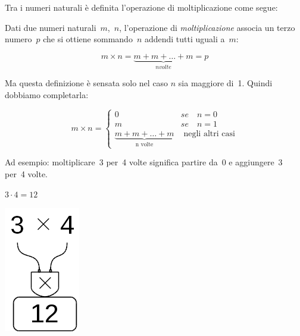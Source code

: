 Tra i numeri naturali è definita l'operazione di moltiplicazione come segue:

\begin{definizione}
Dati due numeri naturali~$m$,~$n$, l'operazione di \emph{moltiplicazione} 
associa un terzo numero~$p$ che si ottiene sommando~$n$ addendi tutti 
uguali a~$m$:

\begin{inaccessibleblock}[
$$m \times n = \mbox{n volte}{(m + m + \dots + m)} = p$$
]
$$m \times n = \underbrace{m + m + \dots + m}_{n volte} = p$$
\end{inaccessibleblock}
\end{definizione}

Ma questa definizione è sensata solo nel caso $n$ sia maggiore di~1.
Quindi dobbiamo completarla:

\begin{inaccessibleblock}[
\begin{definizione}
$$
m \times n = \begin{cases}
 0 & se \quad n = 0\\
 m & se \quad n = 1\\
 \mbox{n volte}{(m + m + \dots + m)} & \mbox{ negli altri casi}
\end{cases}$$
\end{definizione}
]
\begin{definizione}
$$
m \times n = \begin{cases}
 0 & se \quad n = 0\\
 m & se \quad n = 1\\
 \underbrace{m + m + \dots + m}_{\text{n volte}} & \mbox{ negli altri casi}
\end{cases}$$
\end{definizione}
\end{inaccessibleblock}

Ad esempio: moltiplicare~3 per~4 volte significa partire da~0 e 
aggiungere~3 per~4 volte.

\begin{minipage}{0.80\textwidth}
 \centering
 $3 \cdot 4 = 12$

% 
\end{minipage}%
\begin{minipage}{0.15\textwidth}
 \centering
\begin{inaccessibleblock}[]
 \includegraphics[scale=0.35]{img/op_mol.png}
\end{inaccessibleblock}
\end{minipage}%

